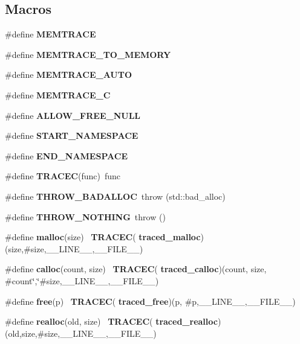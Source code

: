 \subsection*{Macros}
\begin{DoxyCompactItemize}
\item 
\#define \textbf{ M\+E\+M\+T\+R\+A\+CE}
\item 
\#define \textbf{ M\+E\+M\+T\+R\+A\+C\+E\+\_\+\+T\+O\+\_\+\+M\+E\+M\+O\+RY}
\item 
\#define \textbf{ M\+E\+M\+T\+R\+A\+C\+E\+\_\+\+A\+U\+TO}
\item 
\#define \textbf{ M\+E\+M\+T\+R\+A\+C\+E\+\_\+C}
\item 
\#define \textbf{ A\+L\+L\+O\+W\+\_\+\+F\+R\+E\+E\+\_\+\+N\+U\+LL}
\item 
\#define \textbf{ S\+T\+A\+R\+T\+\_\+\+N\+A\+M\+E\+S\+P\+A\+CE}
\item 
\#define \textbf{ E\+N\+D\+\_\+\+N\+A\+M\+E\+S\+P\+A\+CE}
\item 
\#define \textbf{ T\+R\+A\+C\+EC}(func)~func
\item 
\#define \textbf{ T\+H\+R\+O\+W\+\_\+\+B\+A\+D\+A\+L\+L\+OC}~throw (std\+::bad\+\_\+alloc)
\item 
\#define \textbf{ T\+H\+R\+O\+W\+\_\+\+N\+O\+T\+H\+I\+NG}~throw ()
\item 
\#define \textbf{ malloc}(size)~\textbf{ T\+R\+A\+C\+EC}(\textbf{ traced\+\_\+malloc})(size,\#size,\+\_\+\+\_\+\+L\+I\+N\+E\+\_\+\+\_\+,\+\_\+\+\_\+\+F\+I\+L\+E\+\_\+\+\_\+)
\item 
\#define \textbf{ calloc}(count,  size)~\textbf{ T\+R\+A\+C\+EC}(\textbf{ traced\+\_\+calloc})(count, size, \#count\char`\"{},\char`\"{}\#size,\+\_\+\+\_\+\+L\+I\+N\+E\+\_\+\+\_\+,\+\_\+\+\_\+\+F\+I\+L\+E\+\_\+\+\_\+)
\item 
\#define \textbf{ free}(p)~\textbf{ T\+R\+A\+C\+EC}(\textbf{ traced\+\_\+free})(p, \#p,\+\_\+\+\_\+\+L\+I\+N\+E\+\_\+\+\_\+,\+\_\+\+\_\+\+F\+I\+L\+E\+\_\+\+\_\+)
\item 
\#define \textbf{ realloc}(old,  size)~\textbf{ T\+R\+A\+C\+EC}(\textbf{ traced\+\_\+realloc})(old,size,\#size,\+\_\+\+\_\+\+L\+I\+N\+E\+\_\+\+\_\+,\+\_\+\+\_\+\+F\+I\+L\+E\+\_\+\+\_\+)
\end{DoxyCompactItemize}
